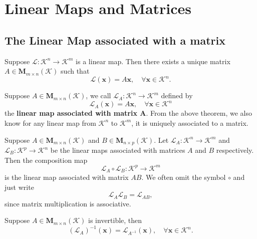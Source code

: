 \documentclass{ctexart}
\begin{document}
	\newpage
	\section{Linear Maps and Matrices}
	\subsection{The Linear Map associated with a matrix}
	\begin{mythm}
		Suppose $\mathcal{L}:\mathcal{K}^n \to \mathcal{K}^m$ is a linear map. Then there exists a unique matrix $A \in \mathbf{M}_{m \times n}(\mathcal{K})$ such that \[\mathcal{L}(\mathbf{x}) = A\mathbf{x}, \quad \forall \mathbf{x} \in \mathcal{K}^n.\]
	\end{mythm}

	\begin{myrmk}
		Suppose $A\in \mathbf{M}_{m \times n}(\mathcal{K})$, we call $\mathcal{L}_A:\mathcal{K}^n \to \mathcal{K}^m$ defined by \[\mathcal{L}_A(\mathbf{x}) = A\mathbf{x}, \quad \forall \mathbf{x} \in \mathcal{K}^n\] the \textbf{linear map associated with matrix A}. From the above theorem, we also know for any linear map from $\mathcal{K}^n$ to $\mathcal{K}^m$, it is uniquely associated to a matrix.
	\end{myrmk}
	\begin{mypro}
		Suppose $A\in \mathbf{M}_{m \times n}(\mathcal{K})$ and $B \in \mathbf{M}_{n \times p}(\mathcal{K})$. Let $\mathcal{L}_A: \mathcal{K}^n \to \mathcal{K}^m$ and $\mathcal{L}_B: \mathcal{K}^p \to \mathcal{K}^n$ be the linear maps associated with matrices $A$ and $B$ respectively. Then the composition map \[\mathcal{L}_A \circ \mathcal{L}_B: \mathcal{K}^p \to \mathcal{K}^m\] is the linear map associated with matrix $AB$. We often omit the symbol $\circ$ and just write 
		\[\mathcal{L}_A \mathcal{L}_B = \mathcal{L}_{AB},\]
		since matrix multiplication is associative.
	\end{mypro}
	\begin{mypro}
		Suppose $A \in \mathbf{M}_{m \times n}(\mathcal{K})$ is invertible, then
		\[
		\left( \mathcal{L}_A\right)^{-1}(\mathbf{x}) = \mathcal{L}_{A^{-1}}(\mathbf{x}), \quad \forall \mathbf{x} \in \mathcal{K}^n.
		\]
	\end{mypro}
\end{document}

